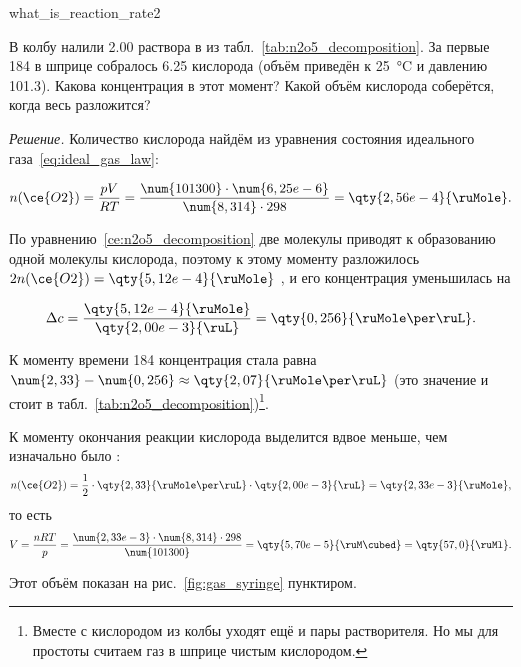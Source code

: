 \begin{example}{}{what_is_reaction_rate2}
    \begin{condition}
        В колбу налили \qty{2,00}{\ruMl} раствора  в  из табл.~\ref{tab:n2o5_decomposition}. За первые \qty{184}{\ruS} в шприце собралось \qty{6,25}{\ruMl} кислорода (объём приведён к \qty{25}{\degreeCelsius} и давлению \qty{101,3}{\ruKPa}). Какова концентрация  в этот момент? Какой объём кислорода соберётся, когда весь  разложится?
    \end{condition}

    \medskip

    \textit{Решение.} Количество кислорода найдём из уравнения состояния идеального газа~\eqref{eq:ideal_gas_law}:

    \begin{equation*}
        n(\ce{O2}) = \frac{pV}{RT} = \frac{\num{101300} \cdot \num{6,25e-6}}{\num{8,314} \cdot 298} = \qty{2,56e-4}{\ruMole}.
    \end{equation*}

    По уравнению~\eqref{ce:n2o5_decomposition} две молекулы  приводят к образованию одной молекулы кислорода, поэтому к этому моменту разложилось $2n(\ce{O2}) = \qty{5,12e-4}{\ruMole}$ , и его концентрация уменьшилась на

    \begin{equation*}
        \Delta c = \frac{\qty{5,12e-4}{\ruMole}}{\qty{2,00e-3}{\ruL}} = \qty{0,256}{\ruMole\per\ruL}.
    \end{equation*}

    К моменту времени \qty{184}{\ruS} концентрация  стала равна $\num{2,33} - \num{0,256} \approx \qty{2,07}{\ruMole\per\ruL}$ (это значение и стоит в табл.~\ref{tab:n2o5_decomposition})\footnote{Вместе с кислородом из колбы уходят ещё и пары растворителя. Но мы для простоты считаем газ в шприце чистым кислородом.}.

    К моменту окончания реакции кислорода выделится вдвое меньше, чем изначально было :
    \begin{equation*}
        n(\ce{O2}) = \frac{1}{2} \cdot \qty{2,33}{\ruMole\per\ruL} \cdot \qty{2,00e-3}{\ruL} = \qty{2,33e-3}{\ruMole},
    \end{equation*}
    то есть
    \begin{equation*}
        V = \frac{nRT}{p} = \frac{\num{2,33e-3} \cdot \num{8,314} \cdot 298}{\num{101300}} = \qty{5,70e-5}{\ruM\cubed} = \qty{57,0}{\ruMl}.
    \end{equation*}

    Этот объём показан на рис.~\ref{fig:gas_syringe} пунктиром.
\end{example}

